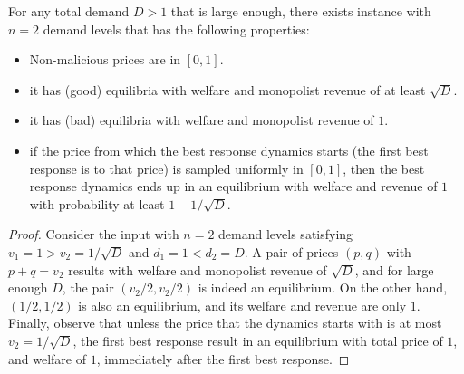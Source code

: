 {\begin{theorem}[High probability of convergence to bad equilibria, $n=2$]
	\label{thm:conv-bad-NE-n is 2}
	For any total demand $D>1$ that is large enough, there exists instance with $n=2$ demand levels
	that has the following properties:
	\begin{itemize}
		\item Non-malicious prices are in $[0,1]$.
		\item it has (good) equilibria with welfare and monopolist revenue of at least $\sqrt{D}$.
		\item it has (bad) equilibria with welfare and monopolist revenue of $1$.
		\item if the price from which the best response dynamics starts (the first best response is to that price) is sampled uniformly in $[0,1]$, then  the best response dynamics ends up in an equilibrium with welfare and revenue of $1$ with probability at least $1-1/\sqrt{D}$.
	\end{itemize}
\end{theorem}
\begin{proof}
	 Consider the input with $n=2$ demand levels satisfying $v_1=1> v_2=1/\sqrt{D}$ and $d_1=1<d_2=D$. %
	 A pair of prices $(p,q)$ with $p+q=v_2$ results with welfare and monopolist revenue of $\sqrt{D}$, and for large enough $D$, the pair $(v_2/2, v_2/2) $ is indeed an equilibrium. On the other hand, $(1/2,1/2)$ is also an equilibrium, and its welfare and revenue are only $1$. Finally, observe that unless the price that the dynamics starts with is at most $v_2=1/\sqrt{D}$, the first best response result in an equilibrium with total price of $1$, and welfare of $1$, immediately after the first best response.
\end{proof}
}


